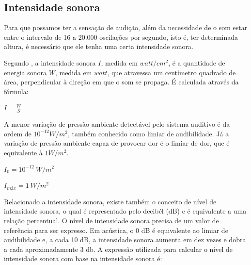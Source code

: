\subsection{Intensidade sonora}

Para que possamos ter a sensação de audição, além da necessidade de o som estar entre o intervalo de 16 a 20.000 oscilações por segundo, isto é, ter determinada altura, é necessário que ele tenha uma certa intensidade sonora. \cite[pág~42]{silva}

Segundo , a intensidade sonora $ I $, medida em $ watt/cm^{2} $, é a quantidade de energia sonora $ W $, medida em $ watt $, que atravessa um centímetro quadrado de área, perpendicular à direção em que o som se propaga. É calculada através da fórmula:

\begin{center}
\begin{Large}
$ I = \frac{W}{S} $
\end{Large}
\end{center}

A menor variação de pressão ambiente detectável pelo sistema auditivo é da ordem de $ 10^{-12}W/m^{2} $, também conhecido como limiar de audibilidade. Já a variação de pressão ambiente capaz de provocar dor é o limiar de dor, que é equivalente à $ 1W/m^{2} $. \cite[pág~6]{bistafa}

\begin{center}
\begin{Large}
$ I_{0} = 10^{-12}~W/m^{2} $
\end{Large}
\end{center}

\begin{center}
\begin{Large}
$ I_{máx} = 1~W/m^{2} $
\end{Large}
\end{center}

Relacionado a intensidade sonora, existe também o conceito de nível de intensidade sonora, o qual é representado pelo decibél (dB) e é equivalente a uma relação percentual. O nível de intensidade sonora precisa de um valor de referência para ser expresso. Em acústica, o 0 dB é equivalente ao limiar de audibilidade e, a cada 10 dB, a intensidade sonora aumenta em dez vezes e dobra a cada aproximadamente 3 db. A expressão utilizada para calcular o nível de intensidade sonora com base na intensidade sonora é: 

